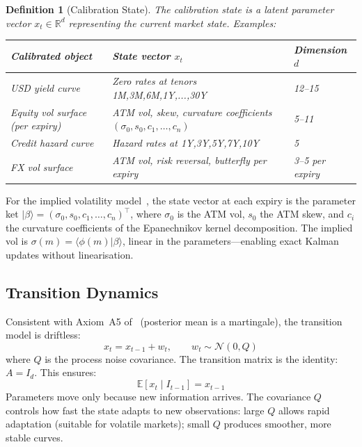 \documentclass[11pt,a4paper]{article}
\newtheorem{definition}{Definition}[section]
\begin{document}
\begin{definition}[Calibration State]
\label{def:cal-state}
The calibration state is a latent parameter vector $x_t \in \mathbb{R}^d$ representing the current market state.  Examples:
\begin{center}
\small
\begin{tabular}{l l l}
\toprule
\textbf{Calibrated object} & \textbf{State vector $x_t$} & \textbf{Dimension $d$} \\
\midrule
USD yield curve & Zero rates at tenors 1M,3M,6M,1Y,...,30Y & 12--15 \\
Equity vol surface (per expiry) & ATM vol, skew, curvature coefficients $(\sigma_0, s_0, c_1, \ldots, c_n)$ & 5--11 \\
Credit hazard curve & Hazard rates at 1Y,3Y,5Y,7Y,10Y & 5 \\
FX vol surface & ATM vol, risk reversal, butterfly per expiry & 3--5 per expiry \\
\bottomrule
\end{tabular}
\end{center}
\end{definition}

\noindent For the implied volatility model~\cite{implied_vol,implied_local_vol}, the state vector at each expiry is the parameter ket $|\beta\rangle = (\sigma_0, s_0, c_1, \ldots, c_n)^\top$, where $\sigma_0$ is the ATM vol, $s_0$ the ATM skew, and $c_i$ the curvature coefficients of the Epanechnikov kernel decomposition.  The implied vol is $\sigma(m) = \langle\phi(m)|\beta\rangle$, linear in the parameters---enabling exact Kalman updates without linearisation.

\subsection{Transition Dynamics}

Consistent with Axiom~A5 of~\cite{calibration_manifesto} (posterior mean is a martingale), the transition model is driftless:
\begin{equation}\label{eq:transition}
x_t = x_{t-1} + w_t, \qquad w_t \sim \mathcal{N}(0, Q)
\end{equation}
where $Q$ is the process noise covariance.  The transition matrix is the identity: $A = I_d$.  This ensures:
\[
\mathbb{E}[x_t \mid I_{t-1}] = x_{t-1}
\]
Parameters move only because new information arrives.  The covariance $Q$ controls how fast the state adapts to new observations: large $Q$ allows rapid adaptation (suitable for volatile markets); small $Q$ produces smoother, more stable curves.
\end{document}
